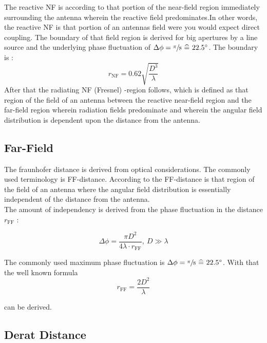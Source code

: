 The reactive \acf{NF} is according to \cite{balanis} \glqq that portion of the near-field region immediately surrounding the antenna wherein the reactive field predominates.\grqq{ }In other words, the reactive \ac{NF} is that portion of an antennas field were you would expect direct coupling. The boundary of that field region is derived for big apertures by a line source and the underlying phase fluctuation of  $\Delta\phi = \sfrac{\pi}{8} \ \widehat{=}\  22.5^\circ$. The boundary is \cite{8393926}:
\begin{equation}
r_{\text{NF}} = 0.62\sqrt{\frac{D^3}{\lambda}}
\end{equation}
After that the radiating \ac{NF} (Fresnel) -region follows, which is defined as \glqq that region of the field of an antenna between the reactive near-field region and the far-field region wherein radiation fields predominate and wherein the angular field distribution is dependent upon the distance from the antenna.\grqq

\subsection{Far-Field}

The fraunhofer distance is derived from optical considerations. The commonly used terminology is \acf{FF}-distance. According to \cite{balanis} the \ac{FF}-distance is \glqq that region of the field of an antenna where the angular field distribution is essentially independent of the distance from the antenna.\grqq \\
The amount of independency is derived from the phase fluctuation in the distance $r_{\text{FF}}$ \cite{19510}:

\begin{equation}
\Delta\phi = \frac{\pi D^2}{4\lambda\cdot r_{\text{FF}}} ,\ D\gg\lambda 
\end{equation}

The commonly used maximum phase fluctuation is $\Delta\phi = \sfrac{\pi}{8} \ \widehat{=}\  22.5^\circ$. With that the well known formula
\begin{equation}
r_{\text{FF}} = \frac{2D^2}{\lambda}
\end{equation}

can be derived.

\subsection{Derat Distance}

